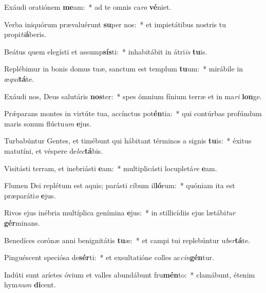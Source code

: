 \item Exáudi oratiónem \textbf{me}am:~* ad te omnis ca\textit{ro} \textbf{vé}niet.
\item Verba iniquórum prævaluérunt \textbf{su}per nos:~* et impietátibus nostris tu propi\textit{ti}\textbf{á}beris.
\item Beátus quem elegísti et assump\textbf{sís}ti:~* inhabitábit in átri\textit{is} \textbf{tu}is.
\item Replébimur in bonis domus tuæ, sanctum est templum \textbf{tu}um:~* mirábile in æ\textit{qui}\textbf{tá}te.
\item Exáudi nos, Deus salutáris \textbf{nos}ter:~* spes ómnium fínium terræ et in ma\textit{ri} \textbf{lon}ge.
\item Prǽparans montes in virtúte tua, accínctus pot\textbf{én}tia:~* qui contúrbas profúndum maris sonum flúctu\textit{um} \textbf{e}jus.
\item Turbabúntur Gentes, et timébunt qui hábitant términos a signis \textbf{tu}is:~* éxitus matutíni, et véspere de\textit{lec}\textbf{tá}bis.
\item Visitásti terram, et inebriásti \textbf{e}am:~* multiplicásti locupletá\textit{re} \textbf{e}am.
\item Flumen Dei replétum est aquis; parásti cibum il\textbf{ló}rum:~* quóniam ita est præparáti\textit{o} \textbf{e}jus.
\item Rivos ejus inébria multíplica genímina \textbf{e}jus:~* in stillicídiis ejus lætábi\textit{tur} \textbf{gér}minans.
\item Benedíces corónæ anni benignitátis \textbf{tu}æ:~* et campi tui replebúntur u\textit{ber}\textbf{tá}te.
\item Pinguéscent speciósa de\textbf{sér}ti:~* et exsultatióne colles ac\textit{cin}\textbf{gén}tur.
\item Indúti sunt aríetes óvium et valles abundábunt fru\textbf{mén}to:~* clamábunt, étenim hym\textit{num} \textbf{di}cent.
